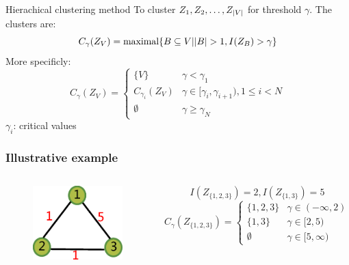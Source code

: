 \documentclass{beamer}
\DeclarePairedDelimiter\abs{\lvert}{\rvert}
\begin{document}
\begin{frame}{Hierachical clustering method}
To cluster $Z_1, Z_2, \dots, Z_{\abs{V}}$ for threshold $\gamma$.
The clusters are:
\begin{equation}
C_{\gamma}(Z_V) = \textrm{maximal}\{ B \subseteq V \vert \abs{B} > 1, I(Z_B) > \gamma \}
\end{equation}
More specificly:
\begin{equation*}
C_{\gamma}(Z_V) = \begin{cases}
\{V\} & \gamma < \gamma_1 \\
C_{\gamma_i}(Z_V) & \gamma \in [\gamma_i, \gamma_{i+1}), 1\leq i < N \\
\emptyset & \gamma \geq \gamma_N
\end{cases}
\end{equation*}
$\gamma_i$: \alert{critical values}
\end{frame}
\begin{frame}
\frametitle{Illustrative example}
\begin{columns}
\column{4cm}
\begin{figure}
\includegraphics[width=4cm]{pic/example.eps}
\end{figure}
\column{6cm}
\begin{equation*}
I(Z_{\{1,2,3\}}) = 2, I(Z_{\{1,3\}}) = 5
\end{equation*}
\begin{equation*}
C_{\gamma}(Z_{\{1,2,3\}}) = \begin{cases}
\{1,2,3\} & \gamma \in (-\infty, 2) \\
\{1, 3\} & \gamma \in [2, 5) \\
\emptyset & \gamma \in [5, \infty)
\end{cases}
\end{equation*}
\end{columns}
\end{frame}
\end{document}
